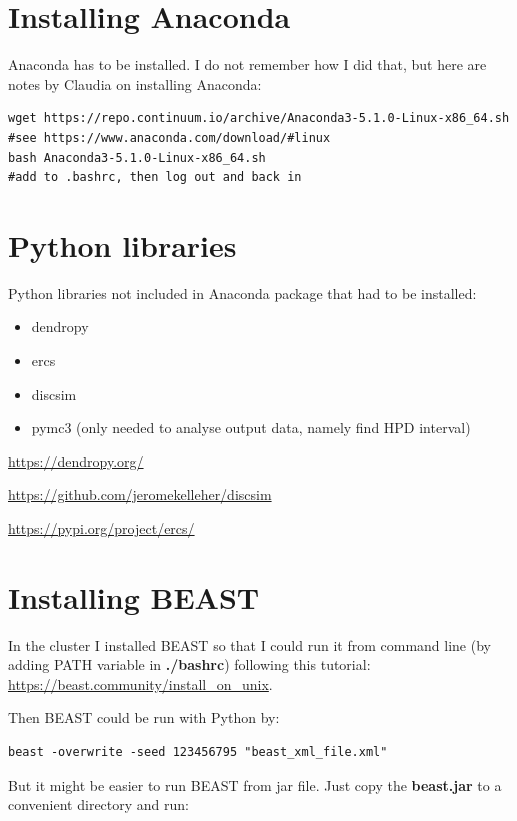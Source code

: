 \section*{Installing Anaconda}

Anaconda has to be installed. I do not remember how I did that, but here are notes by Claudia on installing Anaconda:

\begin{verbatim}
wget https://repo.continuum.io/archive/Anaconda3-5.1.0-Linux-x86_64.sh
#see https://www.anaconda.com/download/#linux
bash Anaconda3-5.1.0-Linux-x86_64.sh
#add to .bashrc, then log out and back in
\end{verbatim}

\section*{Python libraries}

Python libraries not included in Anaconda package that had to be installed:

\begin{itemize}
\item dendropy
\item ercs
\item discsim
\item pymc3 (only needed to analyse output data, namely find HPD interval)
\end{itemize}

\url{https://dendropy.org/}

\url{https://github.com/jeromekelleher/discsim}

\url{https://pypi.org/project/ercs/}

\section*{Installing BEAST}

In the cluster I installed BEAST so that I could run it from command line (by adding PATH variable in \textbf{./bashrc}) following this tutorial: \url{https://beast.community/install_on_unix}.

Then BEAST could be run with Python by:

\begin{verbatim}
beast -overwrite -seed 123456795 "beast_xml_file.xml"
\end{verbatim}

But it might be easier to run BEAST from jar file. Just copy the \textbf{beast.jar} to a convenient directory and run:

